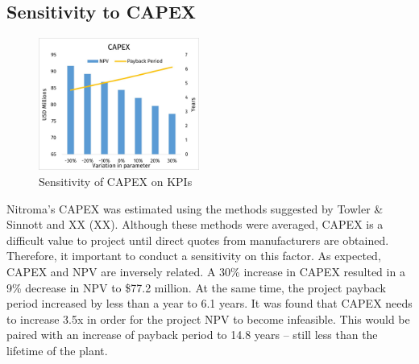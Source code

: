 \subsection{Sensitivity to CAPEX}
\begin{figure}
    \caption{Sensitivity of CAPEX on KPIs}
    \label{Sensitivity_CAPEX}
    \includegraphics[width=0.47\textwidth]{chapters/6-economics/figures/Sensitivity_CAPEX.jpg}
\end{figure}
Nitroma’s CAPEX was estimated using the methods suggested by Towler \& Sinnott and XX (XX). Although these methods were averaged, CAPEX is a difficult value to project until direct quotes from manufacturers are obtained. Therefore, it important to conduct a sensitivity on this factor. As expected, CAPEX and NPV are inversely related. A 30\% increase in CAPEX resulted in a 9\% decrease in NPV to \$77.2 million. At the same time, the project payback period increased by less than a year to 6.1 years. It was found that CAPEX needs to increase 3.5x in order for the project NPV to become infeasible. This would be paired with an increase of payback period to 14.8 years – still less than the lifetime of the plant.

